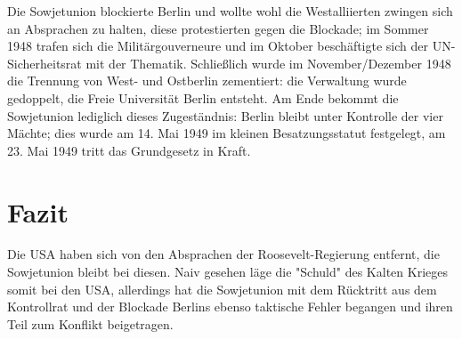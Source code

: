 \documentclass[10pt,a4paper,oneside,ngerman,numbers=noenddot]{scrartcl}
\begin{document}
Die Sowjetunion blockierte Berlin und wollte wohl die Westalliierten zwingen sich an Absprachen zu halten,
diese protestierten gegen die Blockade; im Sommer 1948 trafen sich die Militärgouverneure und im Oktober 
beschäftigte sich der UN-Sicherheitsrat mit der Thematik. Schließlich wurde im November/Dezember 1948 die
Trennung von West- und Ostberlin zementiert: die Verwaltung wurde gedoppelt, die Freie Universität Berlin entsteht.
Am Ende bekommt die Sowjetunion lediglich dieses Zugeständnis: Berlin bleibt unter Kontrolle der vier Mächte;
dies wurde am 14. Mai 1949 im kleinen Besatzungsstatut festgelegt, am 23. Mai 1949 tritt das Grundgesetz in Kraft.

\section{Fazit}

Die USA haben sich von den Absprachen der Roosevelt-Regierung entfernt, die Sowjetunion bleibt bei diesen.
Naiv gesehen läge die "Schuld" des Kalten Krieges somit bei den USA, allerdings hat die Sowjetunion mit dem 
Rücktritt aus dem Kontrollrat und der Blockade Berlins ebenso taktische Fehler begangen und ihren Teil zum Konflikt
beigetragen. 
\end{document}
